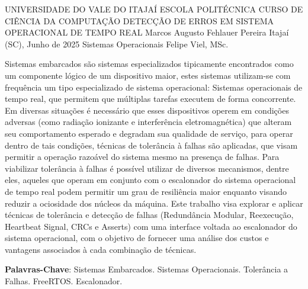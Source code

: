 \begin{Info}
{UNIVERSIDADE DO VALE DO ITAJAÍ}
{ESCOLA POLITÉCNICA}
{CURSO DE CIÊNCIA DA COMPUTAÇÃO}
{DETECÇÃO DE ERROS EM SISTEMA OPERACIONAL DE TEMPO REAL}
{Marcos Augusto Fehlauer Pereira}
{Itajaí (SC), Junho de 2025}
{Sistemas Operacionais}
{Felipe Viel, MSc.}

\end{Info}




\begin{Resumo}
Sistemas embarcados são sistemas especializados tipicamente encontrados como um componente lógico de um dispositivo maior, estes sistemas utilizam-se com frequência um tipo especializado de sistema operacional: Sistemas operacionais de tempo real, que permitem que múltiplas tarefas executem de forma concorrente. Em diversas situações é necessário que esses dispositivos operem em condições adversas (como radiação ionizante e interferência eletromagnética) que alteram seu comportamento esperado e degradam sua qualidade de serviço, para operar dentro de tais condições, técnicas de tolerância à falhas são aplicadas, que visam permitir a operação razoável do sistema mesmo na presença de falhas. Para viabilizar tolerância à falhas é possível utilizar de diversos mecanismos, dentre eles, aqueles que operam em conjunto com o escalonador do sistema operacional de tempo real podem permitir um grau de resiliência maior enquanto visando reduzir a ociosidade dos núcleos da máquina. Este trabalho visa explorar e aplicar técnicas de tolerância e detecção de falhas (Redundância Modular, Reexecução, Heartbeat Signal, CRCs e Asserts) com uma interface voltada ao escalonador do sistema operacional, com o objetivo de fornecer uma análise dos custos e vantagens associados à cada combinação de técnicas.

\textbf{Palavras-Chave}: Sistemas Embarcados. Sistemas Operacionais. Tolerância a Falhas. FreeRTOS. Escalonador.

\end{Resumo}


